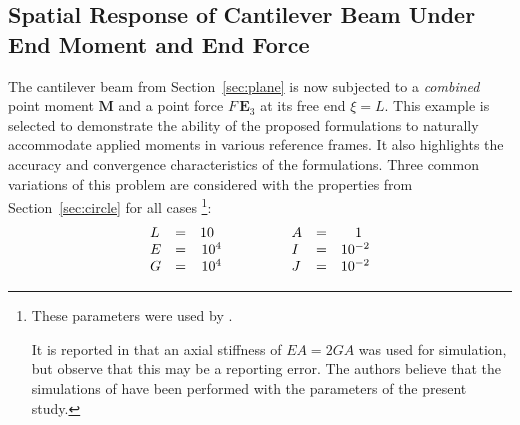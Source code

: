 %
\hypertarget{sec:helical}{%
\subsection{Spatial Response of Cantilever Beam Under End Moment and End Force}\label{sec:helical}}
%
The cantilever beam 
from Section~\ref{sec:plane} is now subjected to a \emph{combined} point moment \(\boldsymbol{M}\) 
and a point force \(F \, \mathbf{E}_3\) at its free end \(\xi=L\).
%
This example is selected to demonstrate the ability of the proposed formulations 
to naturally accommodate applied moments in various reference frames.
It also highlights the accuracy and convergence characteristics of the formulations.
Three common variations of this problem are considered
with the properties from Section~\ref{sec:circle} for all cases
\footnote{These parameters were used by \cite{ritto-corrêa2002differentiation,ibrahimbegovic1997choice}.

It is reported in \cite{ibrahimbegović1995computational} that an axial stiffness of \(EA=2GA\)
was used for simulation, but \cite{ritto-corrêa2002differentiation} observe that this may be a reporting error. The authors believe that the simulations of \cite{ibrahimbegović1995computational}
have been performed with the parameters of the present study.
}:
\[
\begin{array}{lcr}
    L  &=&    10\hphantom{..}    \\ %
    E  &=&    10^4  \\ %
    G  &=&    10^4  \\ %
\end{array}
\qquad\qquad
\begin{array}{lcr}
    A  &=& 1\hphantom{..} \\
    I  &=& 10^{-2} \\
    J  &=& 10^{-2} \\
\end{array}
\]
%
%
